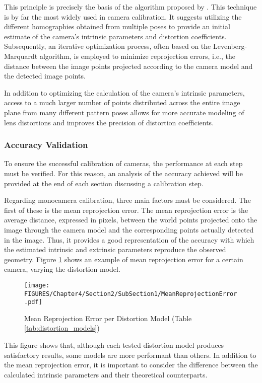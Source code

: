 This principle is precisely the basis of the algorithm proposed by \cite{Zhang2000}. This technique is by far the most widely used in camera calibration. It suggests utilizing the different homographies obtained from multiple poses to provide an initial estimate of the camera's intrinsic parameters and distortion coefficients.  
Subsequently, an iterative optimization process, often based on the Levenberg-Marquardt algorithm, is employed to minimize reprojection errors, i.e., the distance between the image points projected according to the camera model and the detected image points.  

In addition to optimizing the calculation of the camera's intrinsic parameters, access to a much larger number of points distributed across the entire image plane from many different pattern poses allows for more accurate modeling of lens distortions and improves the precision of distortion coefficients.  

\subsubsection{Accuracy Validation}

To ensure the successful calibration of cameras, the performance at each step must be verified. For this reason, an analysis of the accuracy achieved will be provided at the end of each section discussing a calibration step.

Regarding monocamera calibration, three main factors must be considered.  
The first of these is the mean reprojection error. The mean reprojection error is the average distance, expressed in pixels, between the world points projected onto the image through the camera model and the corresponding points actually detected in the image.  
Thus, it provides a good representation of the accuracy with which the estimated intrinsic and extrinsic parameters reproduce the observed geometry.  
Figure \ref{fig:MeanReprojectionError} shows an example of mean reprojection error for a certain camera, varying the distortion model.

\begin{figure}[htbp]
  \centering
  \texttt{[image: FIGURES/Chapter4/Section2/SubSection1/MeanReprojectionError.pdf]}
  \caption{Mean Reprojection Error per Distortion Model (Table \ref{tab:distortion_models})} 
  \label{fig:MeanReprojectionError}  
\end{figure}

This figure shows that, although each tested distortion model produces satisfactory results, some models are more performant than others. In addition to the mean reprojection error, it is important to consider the difference between the calculated intrinsic parameters and their theoretical counterparts.

